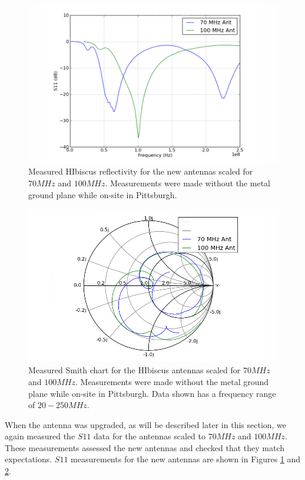 \begin{figure}[htb]
\centering
\includegraphics[width=0.8\linewidth]{SCIHI_system/figures/HIbiscus_S11_dB_both.png}
\caption{Measured HIbiscus reflectivity for the new antennas scaled for $70 MHz$ and $100 MHz$. Measurements were made without the metal ground plane while on-site in Pittsburgh. }
\label{Fig:HIS11_dB}
\end{figure}

\begin{figure}[htb]
\centering
\includegraphics[width=0.8\linewidth]{SCIHI_system/figures/HIbiscus_S11_Smith_both.png}
\caption{Measured Smith chart for the HIbiscus antennas scaled for $70 MHz$ and $100 MHz$. Measurements were made without the metal ground plane while on-site in Pittsburgh. Data shown has a frequency range of $20-250 MHz$.}
\label{Fig:HIS11_Smith}
\end{figure}

When the antenna was upgraded, as will be described later in this section, we again measured the $S11$ data for the antennas scaled to $70 MHz$ and $100 MHz$. These measurements assessed the new antennas and checked that they match expectations. $S11$ measurements for the new antennas are shown in Figures \ref{Fig:HIS11_dB} and \ref{Fig:HIS11_Smith}. 

